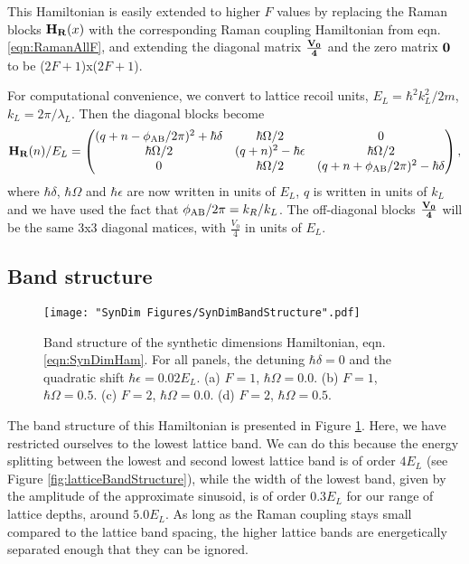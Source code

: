 This Hamiltonian is easily extended to higher $F$ values by replacing the Raman blocks ${\bf H_R}(x)$ with the corresponding Raman coupling Hamiltonian from eqn. \ref{eqn:RamanAllF}, and extending the diagonal matrix  ${\bf \frac{V_0}{4}}$ and the zero matrix $\bf 0$ to be ($2F+1$)x($2F+1$).

For computational convenience, we convert to lattice recoil units, $E_L=\hbar^2 k_L^2/2m$, $k_L=2\pi/\lambda_L$. Then the diagonal blocks become
 \begin{equation}
{\bf H_R}(n)/E_L = 
 \begin{pmatrix} (q + n -\phi_{\rm AB}/2\pi)^2+\hbar\delta & \hbar\Omega/2  &  0  \\ 
\hbar\Omega/2 & (q+n)^2 - \hbar\epsilon &  \hbar\Omega/2\\
 0 & \hbar\Omega/2 & (q + n +\phi_{\rm AB}/2\pi)^2 -\hbar\delta  \\
 \end{pmatrix} \\,
\end{equation}
where $\hbar\delta$, $\hbar\Omega$ and $\hbar\epsilon$ are now written in units of $E_L$, $q$ is written in units of $k_L$ and we have used the fact that $\phi_{\rm AB}/2\pi = k_R/k_L$. The off-diagonal blocks ${\bf \frac{V_0}{4}}$ will be the same 3x3 diagonal matices, with $\frac{V_0}{4}$ in units of $E_L$. 

\subsection{Band structure}
\begin{figure}
	\texttt{[image: "SynDim Figures/SynDimBandStructure".pdf]}
\caption{Band structure of the synthetic dimensions Hamiltonian, eqn. \ref{eqn:SynDimHam}. For all panels, the detuning $\hbar\delta=0$ and the quadratic shift $\hbar\epsilon=0.02 E_L$. (a) $F=1$, $\hbar\Omega=0.0$. (b) $F=1$, $\hbar\Omega=0.5$. (c) $F=2$, $\hbar\Omega=0.0$. (d) $F=2$, $\hbar\Omega=0.5$. }
\label{fig:SynDimBandStruct}
\end{figure}

The band structure of this Hamiltonian is presented in Figure \ref{fig:SynDimBandStruct}. Here, we have restricted ourselves to the lowest lattice band. We can do this because the energy splitting between the lowest and second lowest lattice band is of order $4 E_L$ (see Figure \ref{fig:latticeBandStructure}), while the width of the lowest band, given by the amplitude of the approximate sinusoid, is of order $0.3 E_L$ for our range of lattice depths, around $5.0 E_L$. As long as the Raman coupling stays small compared to the lattice band spacing, the higher lattice bands are energetically separated enough that they can be ignored. 


